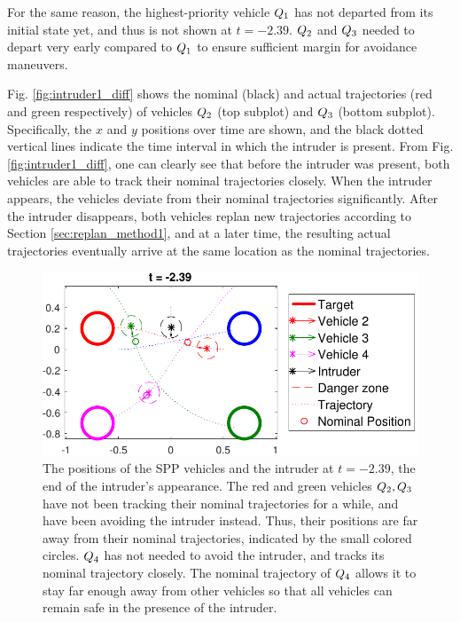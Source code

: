 For the same reason, the highest-priority vehicle $Q_1$ has not departed from its initial state yet, and thus is not shown at $t=-2.39$. $Q_2$ and $Q_3$ needed to depart very early compared to $Q_1$ to ensure sufficient margin for avoidance maneuvers.

Fig. \ref{fig:intruder1_diff} shows the nominal (black) and actual trajectories (red and green respectively) of vehicles $Q_2$ (top subplot) and $Q_3$ (bottom subplot). Specifically, the $x$ and $y$ positions over time are shown, and the black dotted vertical lines indicate the time interval in which the intruder is present. From Fig. \ref{fig:intruder1_diff}, one can clearly see that before the intruder was present, both vehicles are able to track their nominal trajectories closely. When the intruder appears, the vehicles deviate from their nominal trajectories significantly. After the intruder disappears, both vehicles replan new trajectories according to Section \ref{sec:replan_method1}, and at a later time, the resulting actual trajectories eventually arrive at the same location as the nominal trajectories.

\begin{figure}[H]
  \centering
  \includegraphics[width=\columnwidth]{"fig/intruder1_traj"}
  \caption{The positions of the SPP vehicles and the intruder at $t=-2.39$, the end of the intruder's appearance. The red and green vehicles $Q_2, Q_3$ have not been tracking their nominal trajectories for a while, and have been avoiding the intruder instead. Thus, their positions are far away from their nominal trajectories, indicated by the small colored circles. $Q_4$ has not needed to avoid the intruder, and tracks its nominal trajectory closely. The nominal trajectory of $Q_4$ allows it to stay far enough away from other vehicles so that all vehicles can remain safe in the presence of the intruder.}
  \label{fig:intruder1_traj}
\end{figure}

